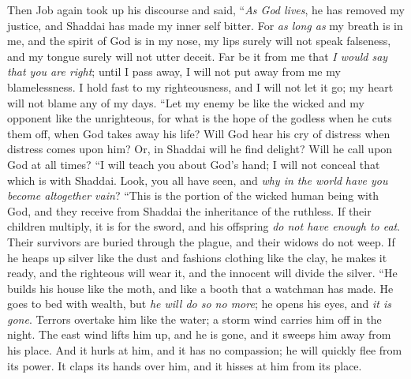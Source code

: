 \begin{biblechapter} %
 Then Job again took up his discourse and said,
\verse “\textit{As God lives}, he has removed my justice, 
and Shaddai has made my inner self bitter.
\verse For \textit{as long as} my breath is in me, 
and the spirit of God is in my nose,
\verse my lips surely will not speak falseness, 
and my tongue surely will not utter deceit.
\verse Far be it from me that \textit{I would say that you are right}; 
until I pass away, I will not put away from me my blamelessness.
\verse I hold fast to my righteousness, and I will not let it go; 
my heart will not blame any of my days.
\verse “Let my enemy be like the wicked 
and my opponent like the unrighteous,
\verse for what is the hope of the godless when he cuts them off, 
when God takes away his life?
\verse Will God hear his cry of distress 
when distress comes upon him?
\verse Or, in Shaddai will he find delight? 
Will he call upon God at all times?
\verse “I will teach you about God’s hand; 
I will not conceal that which is with Shaddai.
\verse Look, you all have seen, 
and \textit{why in the world} \textit{have you become altogether vain}?
\verse “This is the portion of the wicked human being with God, 
and they receive from Shaddai the inheritance of the ruthless.
\verse If their children multiply, it is for the sword, 
and his offspring \textit{do not have enough to eat}.
\verse Their survivors are buried through the plague, 
and their widows do not weep.
\verse If he heaps up silver like the dust 
and fashions clothing like the clay,
\verse he makes it ready, and the righteous will wear it, 
and the innocent will divide the silver.
\verse “He builds his house like the moth, 
and like a booth that a watchman has made.
\verse He goes to bed with wealth, but \textit{he will do so no more}; 
he opens his eyes, and \textit{it is gone}.
\verse Terrors overtake him like the water; 
a storm wind carries him off in the night.
\verse The east wind lifts him up, and he is gone, 
and it sweeps him away from his place.
\verse And it hurls at him, and it has no compassion; 
he will quickly flee from its power.
\verse It claps its hands over him, 
and it hisses at him from its place.
\end{biblechapter}

